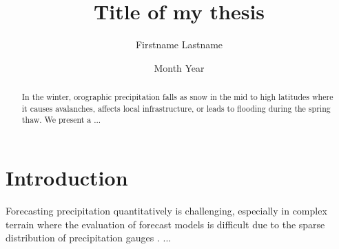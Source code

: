 \documentclass[a4paper,11pt, UKenglish,twoside]{report}
\title{Title of my thesis}	\let\Title\@title
\author{Firstname Lastname}	\let\Author\@author
\date{Month Year}		\let\Date\@date
\begin{document}
\setcounter{page}{0}
\thispagestyle{empty}
\duoforside[program={Meteorology},
    dept={Department of Geoscience},
    fac=Faculty of Mathematics and Natural Sciences,
    image={avhrr201612240330.jpg},
    printer={Reprosentralen, University of Oslo},
    long,
    date={June 2018}]


\singlespacing
\begin{abstract}
    \noindent
    In the winter, orographic precipitation falls as snow in the mid to high latitudes where it causes avalanches, affects local infrastructure, or leads to flooding during the spring thaw. We present a ...
\end{abstract}
\linespread{1.25}
\thispagestyle{empty}
\clearpage\thispagestyle{empty}\hbox{}\newpage %
\normalsize




{\hypersetup{linkcolor=black} 	%

    \newpage
    \setcounter{page}{1}
    \renewcommand{\contentsname}{Table of Contents}
    \tableofcontents
    \thispagestyle{empty}



}



\newpage{}\setcounter{page}{1}
\chapter{Introduction}
\label{ch:intro}

Forecasting precipitation quantitatively is challenging, especially in complex terrain where the evaluation of forecast models is difficult due to the sparse distribution of precipitation gauges \citep{barstad_evaluation_2005}. ...
\end{document}
